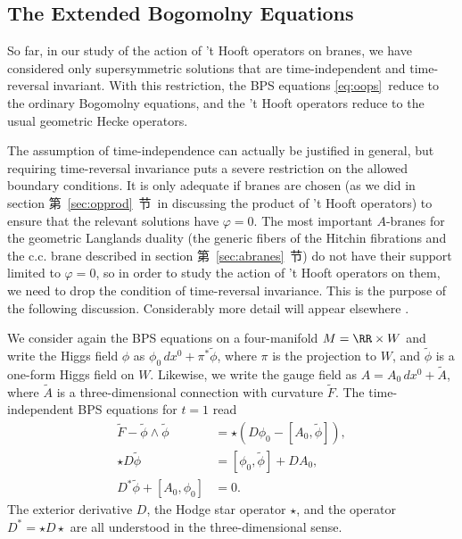 
\subsection{The Extended Bogomolny Equations}

\label{sec:extbog}

So far, in our study of the action of 't Hooft operators on
branes,  we have considered only supersymmetric solutions that are
time-independent and time-reversal invariant.  With this
restriction, the BPS equations \eqref{eq:oops}\ reduce to the ordinary
Bogomolny equations, and the 't Hooft operators reduce to the
usual geometric Hecke operators.

The assumption of time-independence can actually be justified in
general, but requiring time-reversal invariance puts a severe
restriction on the allowed boundary conditions.  It is only
adequate if branes are chosen (as we did in section 第~\ref{sec:opprod}~节\ in
discussing the product of 't Hooft operators) to ensure that the
relevant solutions have $\varphi=0$. The most important $A$-branes
for the geometric Langlands duality (the generic fibers of the
Hitchin fibrations and the c.c. brane described in section
第~\ref{sec:abranes}~节) do not have their support limited to $\varphi=0$, so in
order to study the action of 't Hooft operators on them, we need
to drop the condition of time-reversal invariance.  This is the
purpose of the following discussion.  Considerably more detail
will appear elsewhere \cite{ref26}.

We consider again the BPS equations on a four-manifold
$M=\RR\times W$ and write the Higgs field $\phi$ as $\phi_0\, dx^0
+\pi^*\tilde\phi$, where $\pi$ is the projection to $W$, and
$\tilde\phi$ is a one-form Higgs field on $W$. Likewise, we write
the gauge field as $A=A_0\,dx^0+\tilde A$, where $\tilde A$ is a
three-dimensional connection with curvature $\tilde F$. The
time-independent BPS equations for $t=1$ read
\setcounter{equation}{34}
\begin{equation}\label{eq:BPSstaticgen}
\begin{aligned}\tilde F-\tilde\phi\wedge\tilde\phi&=
\star\left(D\phi_0-[A_0,\tilde\phi]\right),\\ \star
D\tilde\phi&=[\phi_0,\tilde\phi]+D A_0,\\
D^*\tilde\phi+[A_0,\phi_0]&=0.\end{aligned}
\end{equation}
 The exterior derivative $D$, the
Hodge star operator $\star$, and the operator $D^*=\star D\star$
are all understood in the three-dimensional sense.

